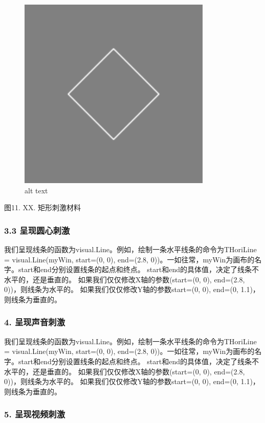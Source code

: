 \documentclass[11pt]{article}
\makeatletter
\def\maxwidth{\ifdim\Gin@nat@width>\linewidth\linewidth
    \else\Gin@nat@width\fi}
\let\Oldincludegraphics\includegraphics
\renewcommand{\includegraphics}[1]{\Oldincludegraphics[width=.8\maxwidth]{#1}}
\makeatother
\begin{document}
    \begin{figure}
\centering
\includegraphics{Ch11-VisualRectStimuli 示例图片.PNG}
\caption{alt text}
\end{figure}

图11. XX. 矩形刺激材料

    \subsubsection{3.3
呈现圆心刺激}\label{ux5448ux73b0ux5706ux5fc3ux523aux6fc0}

我们呈现线条的函数为visual.Line。例如，绘制一条水平线条的命令为THoriLine
= visual.Line(myWin, start=(0, 0), end=(2.8,
0))。一如往常，myWin为画布的名字。start和end分别设置线条的起点和终点。
start和end的具体值，决定了线条不水平的，还是垂直的。
如果我们仅仅修改X轴的参数(start=(0, 0), end=(2.8, 0))，则线条为水平的。
如果我们仅仅修改Y轴的参数start=(0, 0), end=(0, 1.1)，则线条为垂直的。

    \subsubsection{4.
呈现声音刺激}\label{ux5448ux73b0ux58f0ux97f3ux523aux6fc0}

我们呈现线条的函数为visual.Line。例如，绘制一条水平线条的命令为THoriLine
= visual.Line(myWin, start=(0, 0), end=(2.8,
0))。一如往常，myWin为画布的名字。start和end分别设置线条的起点和终点。
start和end的具体值，决定了线条不水平的，还是垂直的。
如果我们仅仅修改X轴的参数(start=(0, 0), end=(2.8, 0))，则线条为水平的。
如果我们仅仅修改Y轴的参数start=(0, 0), end=(0, 1.1)，则线条为垂直的。

    \subsubsection{5.
呈现视频刺激}\label{ux5448ux73b0ux89c6ux9891ux523aux6fc0}
\end{document}
